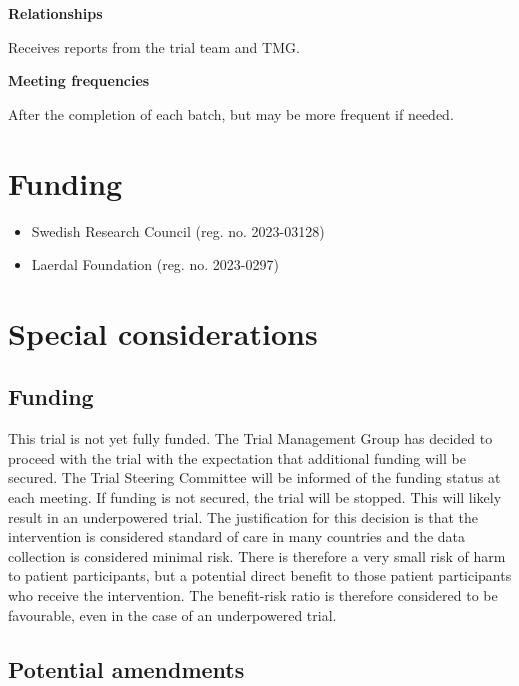 \documentclass[
]{scrartcl}
\providecommand{\tightlist}{%
  \setlength{\itemsep}{0pt}\setlength{\parskip}{0pt}}\usepackage{longtable,booktabs,array}
\begin{document}
\textbf{Relationships}

Receives reports from the trial team and TMG.

\textbf{Meeting frequencies}

After the completion of each batch, but may be more frequent if needed.

\hypertarget{funding}{%
\section{Funding}\label{funding}}

\begin{itemize}
\tightlist
\item
  Swedish Research Council (reg. no. 2023-03128)
\item
  Laerdal Foundation (reg. no. 2023-0297)
\end{itemize}

\hypertarget{special-considerations}{%
\section{Special considerations}\label{special-considerations}}

\hypertarget{funding-1}{%
\subsection{Funding}\label{funding-1}}

This trial is not yet fully funded. The Trial Management Group has
decided to proceed with the trial with the expectation that additional
funding will be secured. The Trial Steering Committee will be informed
of the funding status at each meeting. If funding is not secured, the
trial will be stopped. This will likely result in an underpowered trial.
The justification for this decision is that the intervention is
considered standard of care in many countries and the data collection is
considered minimal risk. There is therefore a very small risk of harm to
patient participants, but a potential direct benefit to those patient
participants who receive the intervention. The benefit-risk ratio is
therefore considered to be favourable, even in the case of an
underpowered trial.

\hypertarget{potential-amendments}{%
\subsection{Potential amendments}\label{potential-amendments}}
\end{document}
